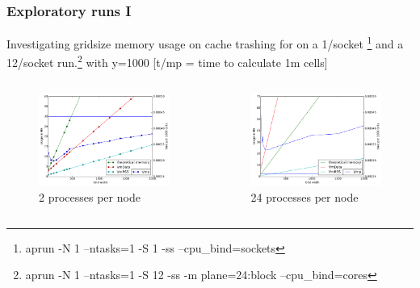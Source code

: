 \documentclass{beamer}
\begin{document}
\begin{frame}
\frametitle{Exploratory runs I}
Investigating gridsize memory usage on cache trashing for  on a 1/socket \footnote{aprun -N 1 --ntasks=1 -S 1 -ss --cpu\_bind=sockets} and a 12/socket run.\footnote{aprun -N 1 --ntasks=1 -S 12 -ss -m plane=24:block --cpu\_bind=cores} with y=1000 \footnotesize{[t/mp = time to calculate 1m cells]}

\begin{minipage}[1\textheight]{\textwidth}
\begin{columns}[T]

\begin{column}{0.5\textwidth}
\begin{figure}
\includegraphics[width=6.15cm]{T2.pdf}
\caption{ 2 processes per node}
\end{figure}

\end{column}


\begin{column}{0.5\textwidth}
\begin{figure}
\includegraphics[width=6.15cm]{T12.pdf}
\caption{24 processes per node}
\end{figure}
\end{column}
\end{columns}
\end{minipage}



\end{frame}
\end{document}

